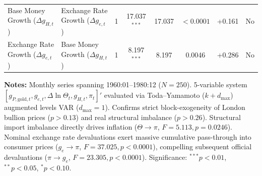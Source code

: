 \begin{table}[htbp]
{\begin{tabular}{llcccccc}
Base Money Growth ($\Delta g_{H,t}$) & Exchange Rate Growth ($\Delta g_{e,t}$) & 1 & 17.037$^{***}$ & 17.037 & $< 0.0001$ & +0.161 & No \\
Exchange Rate Growth ($\Delta g_{e,t}$) & Base Money Growth ($\Delta g_{H,t}$) & 1 & 8.197$^{***}$ & 8.197 & 0.0046 & +0.286 & No \\
\bottomrule
\end{tabular}%
}
\begin{minipage}{0.96\textwidth}
\vspace{0.3em}
\footnotesize \textbf{Notes:} Monthly series spanning 1960:01--1980:12 ($N=250$). 5-variable system $[g_{P,\text{gold},t}, g_{e,t}, \Delta \ln \Theta_t, g_{H,t}, \pi_t]'$ evaluated via Toda--Yamamoto ($k+d_{\max}$) augmented levels VAR ($d_{\max}=1$). Confirms strict block-exogeneity of London bullion prices ($p > 0.13$) and real structural imbalance ($p > 0.26$). Structural import imbalance directly drives inflation ($\Theta \to \pi$, $F = 5.113, p = 0.0246$). Nominal exchange rate devaluations exert massive cumulative pass-through into consumer prices ($g_e \to \pi$, $F = 37.025, p < 0.0001$), compelling subsequent official devaluations ($\pi \to g_e$, $F = 23.305, p < 0.0001$). Significance: $^{***} p < 0.01$, $^{**} p < 0.05$, $^{*} p < 0.10$.
\end{minipage}
\end{table}
